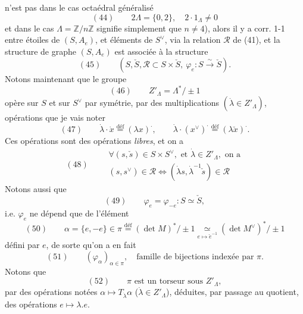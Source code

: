 \documentclass[11pt,a4paper]{article}
\begin{document}
n'est pas dans le cas octaédral généralisé
\[
(44)\qquad 2\Lambda = \{0, 2\}, \quad 2 \cdot 1_{\Lambda} \neq 0
\]
et dans le cas $\Lambda = \mathbb{Z}/n\mathbb{Z}$ signifie simplement que
$n \neq 4$), alors il y a corr. 1-1 entre étoiles de $(S, A_e)$, et éléments
de $S^{\vee}$, via la relation $\mathcal{R}$ de (41), et la structure de graphe
$(S, A_e)$ est associée à la structure
\[
(45)\qquad (S, \check{S}, \mathcal{R} \subset S \times \check{S},\ \varphi_e : S \xrightarrow{\ \sim\ } \check{S}) .
\]
Notons maintenant que le groupe
\[
(46)\qquad Z'_{\Lambda} = \Lambda^{*}/\pm 1
\]
opère sur $S$ et sur $S^{\vee}$ par symétrie,  par des
multiplications $(\dot{\lambda} \in Z'_{\Lambda})$,
opérations que je vais noter \struck{\ill{}}
\[
(47)\qquad \dot{\lambda} \cdot \dot{x} \overset{\text{déf}}{=} (\lambda x)^{\cdot}, \qquad
\dot{\lambda} \cdot (x^{\vee})^{\cdot} \overset{\text{déf}}{=} (\lambda \check{x})^{\cdot} .
\]
 Ces opérations sont des opérations \emph{libres}, et on a
\[
(48)\qquad
\boxed{\begin{array}{l}
\forall (s, \check{s}) \in S \times S^{\vee}, \text{ et } \dot{\lambda} \in Z'_{\Lambda}, \text{ on a} \\
(s, s^{\vee}) \in \mathcal{R} \Longleftrightarrow (\dot{\lambda} s, \dot{\lambda}^{-1} \check{s}) \in \mathcal{R}
\end{array}}
\]
Notons aussi que
\[
(49)\qquad \varphi_e = \varphi_{-e} : S \simeq \check{S},
\]
i.e. $\varphi_e$ ne dépend que de l'élément
\[
(50)\qquad \alpha = \{e, -e\} \in \pi \overset{\text{déf}}{=} (\det M)^{*}/\pm 1 \underset{e \mapsto \check{e}^{-1}}{\simeq} (\det M^{\vee})^{*}/\pm 1
\]
défini par $e$, de sorte qu'on a en fait
\[
(51)\qquad (\varphi_{\alpha})_{\alpha \in \pi}, \quad \text{famille de bijections indexée par } \pi .
\]
Notons que 
\[
(52)\qquad \pi \text{ est un torseur sous } Z'_{\Lambda},
\]
par des opérations notées $\alpha \mapsto T_{\dot{\lambda}}\alpha$
($\dot{\lambda} \in Z'_{\Lambda}$), déduites, par passage au quotient, des
opérations $e \mapsto \lambda . e$.

\end{document}
